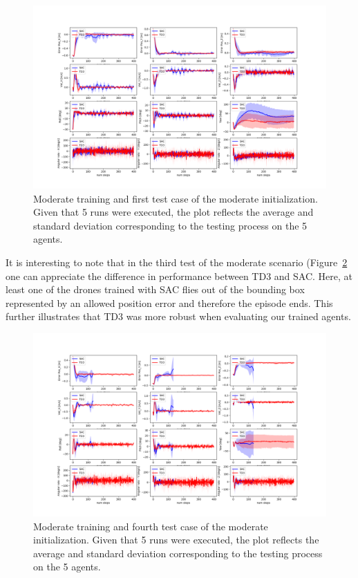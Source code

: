 \begin{figure}[H]
    \includegraphics[width = 1\textwidth]{img/2022-05-05_00:00:00_moderate_states_0_moderate.png}
    \caption{Moderate training and first test case of the moderate initialization. Given 
    that 5 runs were executed, the plot reflects the average and standard deviation 
    corresponding to the testing process on the 5 agents.}
    \label{fig:moderate_moderate_0}
\end{figure}

It is interesting to note that in the third test of the moderate scenario (Figure~\ref{fig:moderate_moderate_3} one can appreciate the difference in performance
between TD3 and SAC. Here, at least one of the drones trained with SAC flies out of 
the bounding box represented by an allowed position error and therefore the episode 
ends. This further illustrates that TD3 was more robust when evaluating our trained agents.

\begin{figure}[H]
    \includegraphics[width = 1\textwidth]{img/2022-05-05_00:00:00_moderate_states_3_moderate.png}
    \caption{Moderate training and fourth test case of the moderate initialization. Given 
    that 5 runs were executed, the plot reflects the average and standard deviation 
    corresponding to the testing process on the 5 agents.}
    \label{fig:moderate_moderate_3}
\end{figure}

